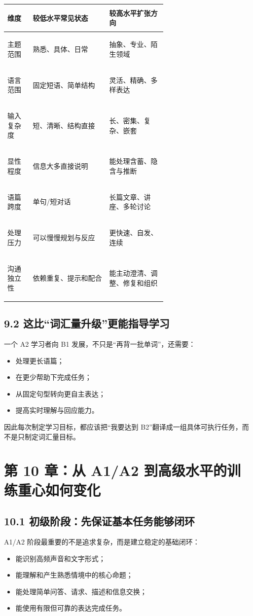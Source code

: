 \documentclass[11pt,a4paper]{ctexart}
\begin{document}
\begin{center}
\small
\begin{tabularx}{\linewidth}{>{\bfseries\raggedright\arraybackslash}p{0.16\linewidth} >{\raggedright\arraybackslash}p{0.48\linewidth} Y}
\toprule
维度 & 较低水平常见状态 & 较高水平扩张方向 \\
\midrule
主题范围 & 熟悉、具体、日常 & 抽象、专业、陌生领域 \\
语言范围 & 固定短语、简单结构 & 灵活、精确、多样表达 \\
输入复杂度 & 短、清晰、结构直接 & 长、密集、复杂、嵌套 \\
显性程度 & 信息大多直接说明 & 能处理含蓄、隐含与推断 \\
语篇跨度 & 单句/短对话 & 长篇文章、讲座、多轮讨论 \\
处理压力 & 可以慢慢规划与反应 & 更快速、自发、连续 \\
沟通独立性 & 依赖重复、提示和配合 & 能主动澄清、调整、修复和组织 \\
\bottomrule
\end{tabularx}
\end{center}

\subsection{9.2 这比“词汇量升级”更能指导学习}
一个 A2 学习者向 B1 发展，不只是“再背一批单词”，还需要：
\begin{itemize}
  \item 处理更长语篇；
  \item 在更少帮助下完成任务；
  \item 从固定句型转向更自主表达；
  \item 提高实时理解与回应能力。
\end{itemize}
因此每次制定学习目标，都应该把“我要达到 B2”翻译成一组具体可执行任务，而不是只制定词汇量目标。

\newpage
\section{第 10 章：从 A1/A2 到高级水平的训练重心如何变化}

\subsection{10.1 初级阶段：先保证基本任务能够闭环}
A1/A2 阶段最重要的不是追求复杂，而是建立稳定的基础闭环：
\begin{itemize}
  \item 能识别高频声音和文字形式；
  \item 能理解和产生熟悉情境中的核心命题；
  \item 能处理简单问答、请求、描述和信息交换；
  \item 能使用有限但可靠的表达完成任务。
\end{itemize}
\end{document}
